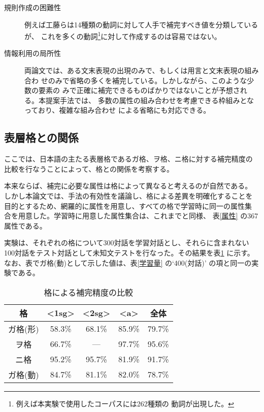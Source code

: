 \begin{description}
\item[規則作成の困難性]
例えば工藤らは14種類の動詞に対して人手で補完すべき値を分類しているが、
これを多くの動詞\footnote{例えば本実験で使用したコーパスには262種類の
動詞が出現した。}に対して作成するのは容易ではない。

\item[情報利用の局所性]
両論文では、ある文末表現の出現のみで、もしくは用言と文末表現の組み合わ
せのみで省略の多くを補完している。しかしながら、このような少数の要素の
みで正確に補完できるものばかりではないことが予想される。本提案手法では、
多数の属性の組み合わせを考慮できる枠組みとなっており、複雑な組み合わせ
による省略にも対応できる。

\end{description}


\subsection{表層格との関係}
\label{節:格}

ここでは、日本語の主たる表層格であるガ格、ヲ格、ニ格に対する補完精度の
比較を行なうことによって、格との関係を考察する。

本来ならば、補完に必要な属性は格によって異なると考えるのが自然である。
しかし本論文では、手法の有効性を議論し、格による差異を明確化することを
目的とするため、網羅的に属性を用意し、すべての格で学習時に同一の属性集
合を用意した。学習時に用意した属性集合は、これまでと同様、
表\ref{属性} の367属性である。

実験は、それぞれの格について300対話を学習対話とし、それらに含まれない
100対話をテスト対話として未知文テストを行なった。その結果を表\ref{格} に示す。
なお、表でガ格(動)として示した値は、表\ref{学習量} の`400(対話)'
の項と同一の実験である。


\begin{table}
\begin{center}
\caption{格による補完精度の比較}
\label{格}
\begin{tabular}{c|*{4}{c}}
\hline\hline
格        &<1sg>& <2sg> &<a> \hfill & 全体 \\
\hline
ガ格(形)&       58.3\% & 68.1\% & 85.9\% & 79.7\% \\
ヲ格    &       66.7\% & ---    & 97.7\% & 95.6\% \\
ニ格    &       95.2\% & 95.7\% & 81.9\% & 91.7\% \\
\hline
ガ格(動)&       84.7\% & 81.1\% & 82.0\% & 78.7\% \\
\hline
\end{tabular}
\end{center}
\end{table}

